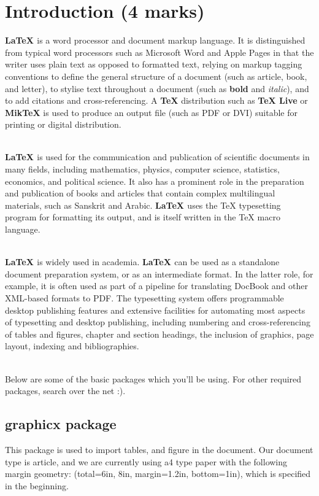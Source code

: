 \documentclass[12pt]{article}
\begin{document}
\section{Introduction (4 marks)}
\begin{footnotesize}
\textbf{\LaTeX{ }} is a word processor and document markup language. It is distinguished
from typical word processors such as Microsoft Word and Apple Pages in that
the writer uses plain text as opposed to formatted text, relying on markup
tagging conventions to define the general structure of a document (such as
article, book, and letter), to stylise text throughout a document (such as \textbf{bold}
and \textit{italic}), and to add citations and cross-referencing. A \textbf{\TeX} distribution such
as \textbf{\TeX{ } Live} or \textbf{MikTeX} is used to produce an output file (such as PDF or DVI)
suitable for printing or digital distribution.\par\mbox{}\\
\textbf{\LaTeX{ }} is used for the communication and publication of scientific documents
in many fields, including mathematics, physics, computer science, statistics,
economics, and political science. It also has a prominent role in the preparation
and publication of books and articles that contain complex multilingual materials, such as Sanskrit and Arabic. \textbf{\LaTeX{ }} uses the TeX typesetting program for
formatting its output, and is itself written in the TeX macro language.\par\mbox{}\\
\textbf{\LaTeX{ }} is widely used in academia. \textbf{\LaTeX{ }} can be used as a standalone document preparation system, or as an intermediate format. In the latter role, for
example, it is often used as part of a pipeline for translating DocBook and other
XML-based formats to PDF. The typesetting system offers programmable desktop publishing features and extensive facilities for automating most aspects of
typesetting and desktop publishing, including numbering and cross-referencing
of tables and figures, chapter and section headings, the inclusion of graphics,
page layout, indexing and bibliographies.\par\mbox{}\\
Below are some of the basic packages which you’ll be using. For other
required packages, search over the net :).
\end{footnotesize}
\subsection{graphicx package}
This package is used to import tables, and figure in the document. Our
document type is article, and we are currently using a4 type paper with the
following margin geometry: (total={6in, 8in}, margin=1.2in, bottom=1in),
which is specified in the beginning.
\end{document}
